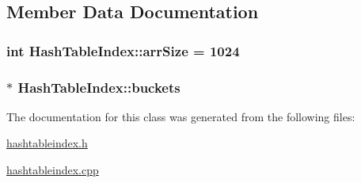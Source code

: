 \subsection{Member Data Documentation}
\hypertarget{class_hash_table_index_a7253d4d2a147715df75217f1731245e9}{}
\subsubsection[{arr\+Size}]{\setlength{\rightskip}{0pt plus 5cm}int Hash\+Table\+Index\+::arr\+Size = 1024\hspace{0.3cm}{\ttfamily [private]}}\label{class_hash_table_index_a7253d4d2a147715df75217f1731245e9}
\hypertarget{class_hash_table_index_a7737d10bb5720666b0bff86376a82a11}{}
\subsubsection[{buckets}]{$\ast$ Hash\+Table\+Index\+::buckets\hspace{0.3cm}{\ttfamily [private]}}\label{class_hash_table_index_a7737d10bb5720666b0bff86376a82a11}


The documentation for this class was generated from the following files\+:\begin{DoxyCompactItemize}
\item 
\hyperlink{hashtableindex_8h}{hashtableindex.\+h}\item 
\hyperlink{hashtableindex_8cpp}{hashtableindex.\+cpp}\end{DoxyCompactItemize}
